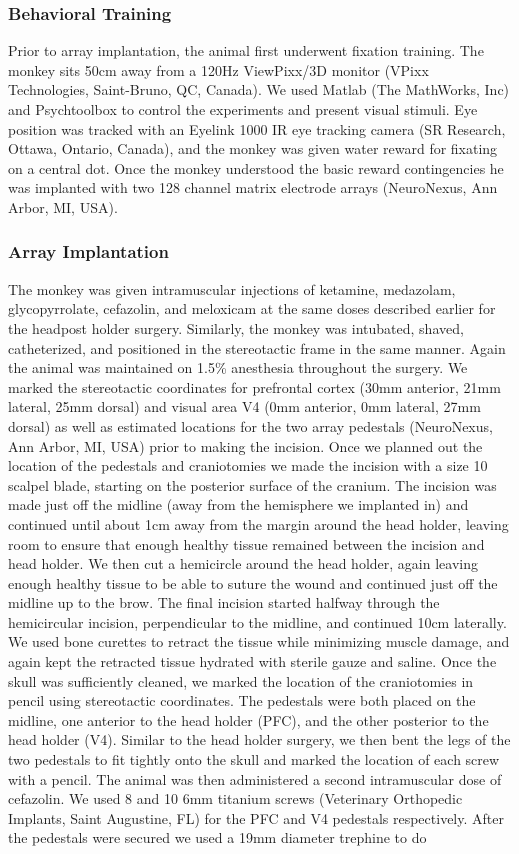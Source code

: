 \subsubsection*{Behavioral Training} Prior to array implantation, the animal first underwent fixation training. The monkey sits 50cm away from a 120Hz ViewPixx/3D monitor (VPixx Technologies, Saint-Bruno, QC, Canada). We used Matlab (The MathWorks, Inc) and Psychtoolbox to control the experiments and present visual stimuli. Eye position was tracked with an Eyelink 1000 IR eye tracking camera (SR Research, Ottawa, Ontario, Canada), and the monkey was given water reward for fixating on a central dot. Once the monkey understood the basic reward contingencies he was implanted with two 128 channel matrix electrode arrays (NeuroNexus, Ann Arbor, MI, USA).

\subsubsection*{Array Implantation} The monkey was given intramuscular injections of ketamine, medazolam, glycopyrrolate, cefazolin, and meloxicam at the same doses described earlier for the headpost holder surgery. Similarly, the monkey was intubated, shaved, catheterized, and positioned in the stereotactic frame in the same manner. Again the animal was maintained on 1.5\% anesthesia throughout the surgery. We marked the stereotactic coordinates for prefrontal cortex (30mm anterior, 21mm lateral, 25mm dorsal) and visual area V4 (0mm anterior, 0mm lateral, 27mm dorsal) as well as estimated locations for the two array pedestals (NeuroNexus, Ann Arbor, MI, USA) prior to making the incision. Once we planned out the location of the pedestals and craniotomies we made the incision with a size 10 scalpel blade, starting on the posterior surface of the cranium. The incision was made just off the midline (away from the hemisphere we implanted in) and continued until about 1cm away from the margin around the head holder, leaving room to ensure that enough healthy tissue remained between the incision and head holder. We then cut a hemicircle around the head holder, again leaving enough healthy tissue to be able to suture the wound and continued just off the midline up to the brow. The final incision started halfway through the hemicircular incision, perpendicular to the midline, and continued 10cm laterally. We used bone curettes to retract the tissue while minimizing muscle damage, and again kept the retracted tissue hydrated with sterile gauze and saline. Once the skull was sufficiently cleaned, we marked the location of the craniotomies in pencil using stereotactic coordinates. The pedestals were both placed on the midline, one anterior to the head holder (PFC), and the other posterior to the head holder (V4). Similar to the head holder surgery, we then bent the legs of the two pedestals to fit tightly onto the skull and marked the location of each screw with a pencil. The animal was then administered a second intramuscular dose of cefazolin. We used 8 and 10 6mm titanium screws (Veterinary Orthopedic Implants, Saint Augustine, FL) for the PFC and V4 pedestals respectively. After the pedestals were secured we used a 19mm diameter trephine to do 